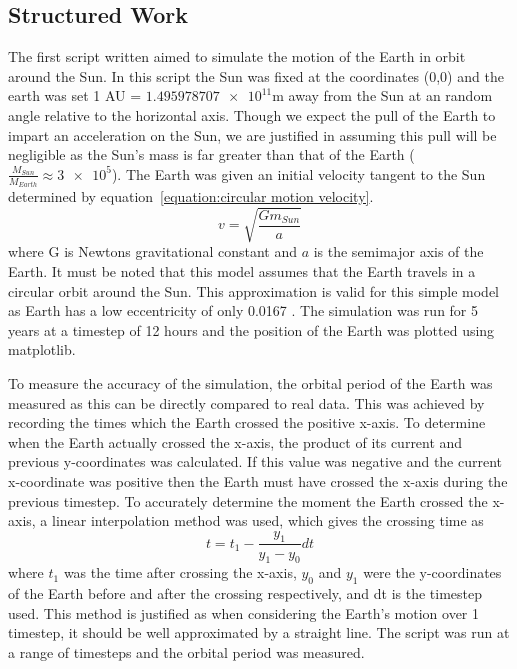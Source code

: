 \documentclass[11pt, a4paper, onecolumn]{article}
\begin{document}
\subsection{Structured Work}
The first script written aimed to simulate the motion of the Earth in orbit around the Sun. 
In this script the Sun was fixed at the coordinates (0,0) and the earth was set 1 AU = $\num{1.495978707e11}$m away from the Sun at an random angle 
relative to the horizontal axis. 
Though we expect the pull of the Earth to impart an acceleration on the Sun, we are justified in assuming this pull will be negligible as the Sun's mass 
is far greater than that of the Earth ($\frac{M_{Sun}}{M_{Earth}}\approx\num{3e5}$). 
The Earth was given an initial velocity tangent to the Sun determined by equation~\ref{equation:circular motion velocity}. 
\begin{equation}
    \label{equation:circular motion velocity}
    v=\sqrt{\frac{Gm_{Sun}}{a}}
\end{equation}
where G is Newtons gravitational constant and $a$ is the semimajor axis of the Earth. 
It must be noted that this model assumes that the Earth travels in a circular orbit around the Sun. 
This approximation is valid for this simple model as Earth has a low eccentricity of only 0.0167 \cite{earth_eccentricity}. 
The simulation was run for 5 years at a timestep of 12 hours and the position of the Earth was plotted using matplotlib. 


To measure the accuracy of the simulation, the orbital period of the Earth was measured as this can be directly compared to real data. 
This was achieved by recording the times which the Earth crossed the positive x-axis. 
To determine when the Earth actually crossed the x-axis, the product of its current and previous y-coordinates was calculated. 
If this value was negative and the current x-coordinate was positive then the Earth must have crossed the x-axis during the previous timestep.
To accurately determine the moment the Earth crossed the x-axis, a linear interpolation method was used, which gives the crossing time as 
\begin{equation}
    t=t_1-\frac{y_1}{y_1-y_0}dt
\end{equation}
where $t_1$ was the time after crossing the x-axis, $y_0$ and $y_1$ were the y-coordinates of the Earth before and after the crossing respectively, and dt is the timestep used. 
This method is justified as when considering the Earth's motion over 1 timestep, it should be well approximated by a straight line.
The script was run at a range of timesteps and the orbital period was measured. 
\end{document}
